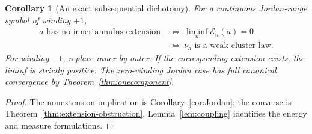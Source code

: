 \documentclass[11pt]{article}
\newtheorem{corollary}[theorem]{Corollary}
\theoremstyle{definition}
\newcommand{\E}{\mathcal E}
\begin{document}
\begin{corollary}[An exact subsequential dichotomy]\label{cor:dichotomy}
For a continuous Jordan-range symbol of winding $+1$,
\begin{equation}
 \boxed{\begin{aligned}
 a\text{ has no inner-annulus extension}
 &\ \Longleftrightarrow\ \liminf_n\E_n(a)=0\\
 &\ \Longleftrightarrow\ \nu_a\text{ is a weak cluster law.}
 \end{aligned}}
 \label{eq:dichotomy}
\end{equation}
For winding $-1$, replace inner by outer. If the corresponding extension exists, the liminf is strictly positive. The zero-winding Jordan case has full canonical convergence by Theorem~\ref{thm:onecomponent}.
\end{corollary}
\begin{proof}
The nonextension implication is Corollary~\ref{cor:Jordan}; the converse is Theorem~\ref{thm:extension-obstruction}. Lemma~\ref{lem:coupling} identifies the energy and measure formulations.
\end{proof}
\end{document}
